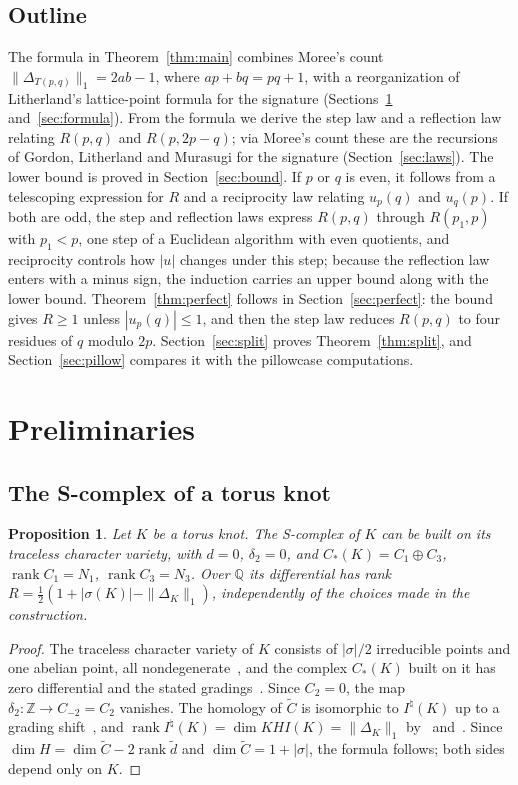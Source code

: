 \documentclass[11pt,reqno]{amsart}
\theoremstyle{plain}
\newtheorem{proposition}[theorem]{Proposition}
\theoremstyle{definition}
\newcommand{\Z}{\mathbb{Z}}
\newcommand{\Q}{\mathbb{Q}}
\newcommand{\Inat}{I^{\natural}}
\newcommand{\td}{\widetilde d}
\newcommand{\tC}{\widetilde C}
\begin{document}
\subsection{Outline}
The formula in Theorem~\ref{thm:main} combines Moree's count $\|\Delta_{T(p,q)}\|_1=2ab-1$, where
$ap+bq=pq+1$, with a reorganization of Litherland's lattice-point formula for the signature
(Sections~\ref{sec:prelim} and~\ref{sec:formula}). From the formula we derive the step law and a
reflection law relating $R(p,q)$ and $R(p,2p-q)$; via Moree's count these are the recursions of Gordon,
Litherland and Murasugi for the signature (Section~\ref{sec:laws}). The lower bound is proved in
Section~\ref{sec:bound}. If $p$ or $q$ is even, it follows from a telescoping expression for $R$ and a
reciprocity law relating $u_p(q)$ and $u_q(p)$. If both are odd, the step and reflection laws express
$R(p,q)$ through $R(p_1,p)$ with $p_1<p$, one step of a Euclidean algorithm with even quotients, and
reciprocity controls how $|u|$ changes under this step; because the reflection law enters with a minus
sign, the induction carries an upper bound along with the lower bound. Theorem~\ref{thm:perfect} follows
in Section~\ref{sec:perfect}: the bound gives $R\ge1$ unless $|u_p(q)|\le1$, and then the step law reduces
$R(p,q)$ to four residues of $q$ modulo $2p$. Section~\ref{sec:split} proves Theorem~\ref{thm:split}, and
Section~\ref{sec:pillow} compares it with the pillowcase computations.

\section{Preliminaries}\label{sec:prelim}

\subsection{The S-complex of a torus knot}

\begin{proposition}\label{prop:rankformula}
Let $K$ be a torus knot. The S-complex of $K$ can be built on its traceless character variety, with
$d=0$, $\delta_2=0$, and $C_*(K)=C_1\oplus C_3$, $\operatorname{rank}C_1=N_1$, $\operatorname{rank}C_3=N_3$.
Over $\Q$ its differential has rank $R=\frac12(1+|\sigma(K)|-\|\Delta_K\|_1)$, independently of the choices
made in the construction.
\end{proposition}

\begin{proof}
The traceless character variety of $K$ consists of $|\sigma|/2$ irreducible points and one abelian
point, all nondegenerate~\cite[\S9.5]{DSEquiv}, and the complex $C_*(K)$ built on it has zero
differential and the stated gradings~\cite[\S1, Cor.~3 and its proof]{DScaduto}. Since $C_2=0$, the map
$\delta_2\colon\Z\to C_{-2}=C_2$ vanishes. The homology of $\tC$ is isomorphic to $\Inat(K)$ up to a
grading shift~\cite[Thm.~8.9]{DSEquiv}, and $\operatorname{rank}\Inat(K)=\dim KHI(K)=\|\Delta_K\|_1$
by~\cite[Prop.~1.4]{KM2} and~\cite[Cor.~1.8]{LiYe}. Since $\dim H=\dim\tC-2\operatorname{rank}\td$ and
$\dim\tC=1+|\sigma|$, the formula follows; both sides depend only on $K$.
\end{proof}
\end{document}
